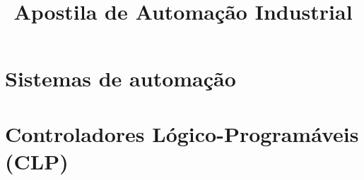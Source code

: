 \documentclass[12pt,oneside]{report}
\title{Apostila de Automação Industrial}
\begin{document}
\maketitle
\tableofcontents
\chapter{Sistemas de automação}



\chapter{Controladores Lógico-Programáveis (CLP)}










\end{document}
